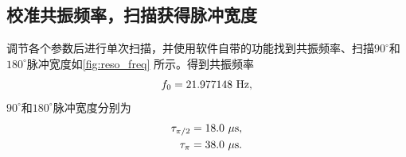 \documentclass[font=default]{mpltx}
\begin{document}
\subsection{校准共振频率，扫描获得脉冲宽度}
调节各个参数后进行单次扫描，并使用软件自带的功能找到共振频率、扫描$90^\circ$和$180^\circ$脉冲宽度如\autoref{fig:reso_freq} 所示。得到共振频率
\begin{equation}
  f_0=21.977148\ {\rm Hz},
\end{equation}$90^\circ$和$180^\circ$脉冲宽度分别为
\begin{equation}
  \begin{aligned}
    \tau_{\pi/2}=18.0\ \mu {\rm s},\\
		\tau_{\pi}=38.0\ \mu {\rm s}.
  \end{aligned}
\end{equation}
\begin{figure}[htbp]
  \centering    %
\end{figure}
\end{document}
